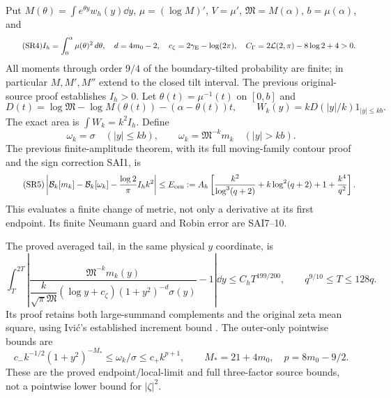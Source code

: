 \documentclass[11pt,a4paper]{article}
\begin{document}
Put $M(\theta)=\int e^{\theta y}w_h(y)\dd y$, $\mu=(\log M)'$,
$V=\mu'$, $\mathfrak M=M(\alpha)$, $b=\mu(\alpha)$, and
\begin{equation}\tag{SR4}
 I_h=\int_0^\alpha\mu(\theta)^2\,d\theta,\quad d=4m_0-2,\quad
 c_\zeta=2\gamma_{\rm E}-\log(2\pi),\quad
 C_\Gamma=2\mathcal L(2,\pi)-8\log2+4>0.
\end{equation}
All moments through order $9/4$ of the boundary-tilted probability are finite;
in particular $M,M',M''$ extend to the closed tilt interval. The previous
original-source proof establishes $I_h>0$.
Let $\theta(t)=\mu^{-1}(t)$ on $[0,b]$ and
\[
 D(t)=\log\mathfrak M-\log M(\theta(t))-(\alpha-\theta(t))t,
 \qquad W_k(y)=kD(|y|/k)1_{|y|\le kb}.
\]
The exact area is $\int W_k=k^2I_h$. Define
\[
 \omega_k=\sigma\quad(|y|\le kb),\qquad
 \omega_k=\mathfrak M^{-k}m_k\quad(|y|>kb).
\]
The previous finite-amplitude theorem, with its full moving-family contour
proof and the sign correction SAI1, is
\begin{equation}\tag{SR5}
 \left|\mathcal B_k[m_k]-\mathcal B_k[\omega_k]
       -\frac{\log2}{\pi}I_hk^2\right|
 \le E_{\rm cen}:=A_h\left[
 \frac{k^2}{\log^3(q+2)}+k\log^2(q+2)+1+\frac{k^4}{q^2}\right].
\end{equation}
This evaluates a finite change of metric, not only a derivative at its first
endpoint. Its finite Neumann guard and Robin error are SAI7--10.

The proved averaged tail, in the same physical $y$ coordinate, is
\begin{equation}\tag{SR6}
 \int_T^{2T}\left|
 \frac{\mathfrak M^{-k}m_k(y)}
 {\dfrac{k}{\sqrt\pi\mathfrak M}(\log y+c_\zeta)
 (1+y^2)^{-d}\sigma(y)}-1\right|\dd y
 \le C_hT^{199/200},\qquad q^{9/10}\le T\le128q.
\end{equation}
Its proof retains both large-summand complements and the original zeta
mean square, using Ivi\'c's established increment bound \cite{a02sr:Ivic}.
The outer-only pointwise bounds are
\begin{equation}\tag{SR7}
 c_-k^{-1/2}(1+y^2)^{-M_*}\le\omega_k/\sigma
 \le c_+k^{p+1},\qquad M_*=21+4m_0,\quad p=8m_0-9/2.
\end{equation}
These are the proved endpoint/local-limit and full three-factor source bounds,
not a pointwise lower bound for $|\zeta|^2$.
\end{document}
